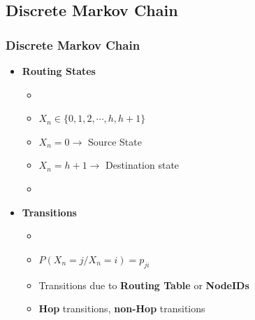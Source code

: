 \documentclass[xcolor=pdftex,dvipsnames,table]{beamer}
\begin{document}
\subsection{Discrete Markov Chain}
\begin{frame}
\frametitle{Discrete Markov Chain}
   \begin{itemize} \vspace{-0.3in}
    \item{\textbf{Routing States}}
        \begin{itemize}
          \item[]
          \item $X_n \in \{0,1,2,\cdots,h,h+1\}$
          \item $X_n = 0 \rightarrow$ Source State
          \item $X_n = h+1 \rightarrow$ Destination state \vspace{+0.05in}
          \item [] %
        \end{itemize} \vspace{0.1in}
    \item{\textbf{Transitions}}
        \begin{itemize}
           \item[]
           \item  $P(X_n  = j / X_n = i) = p_{ji}$
           \item  Transitions due to \textbf{Routing Table} or \textbf{NodeIDs}
           \item  \textbf{Hop} transitions, \textbf{non-Hop} transitions
        \end{itemize}
    \end{itemize}
\end{frame}
\end{document}
